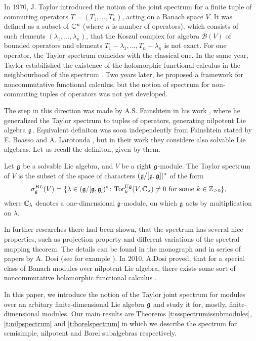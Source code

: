 In 1970, J. Taylor\cite{Taylor1970} introduced the notion of the joint spectrum for a finite tuple
of commuting operators $T = (T_1,...,T_n)$, acting on a Banach space $V$. It was defined as a
subset of $\mathbb{C}^n$ (where $n$ is number of operators), which consists of such elements
$(\lambda_1,...,\lambda_n)$, that the Koszul complex for algebra $\mathcal{B}(V)$ of bounded
operators and elements $T_1 - \lambda_1,...,T_n - \lambda_n$ is not exact. For one operator, the
Taylor spectrum coincides with the classical one. In the same year, Taylor estabilished the
existence of the holomorphic functional calculus in the neighbourhood of the spectrum
\cite{Taylor1970b}. Two years later, he proposed a framework for noncommutative functional
calculus\cite{Taylor1972}, but the notion of spectrum for non-commuting tuples of operators was not
yet developed. 

The step in this direction was made by A.S. Fainshtein in his work \cite{Fainshtein}, where he
generalized the Taylor spectrum to tuples of operators, generating nilpotent Lie algebra $\mathfrak{g}$.
Equivalent definiton was soon independently from Fainshtein stated by E. Boasso and A. Larotonda
\cite{boasso}, but in their work they considere also solvable Lie algebras. Let us recall the
definiton, given by them.
\begin{definition}
    Let $\mathfrak{g}$ be a solvable Lie algebra, and $V$ be a right $\mathfrak{g}$-module. The Taylor spectrum
    of $V$ is the subset of the space of characters $(\mathfrak{g}/[\mathfrak{g},\mathfrak{g}])^*$ of the form
    \begin{equation} \label{e:boassolarotonda}
        \sigma^{BL}_{\mathfrak{g}}(V) = \{ \lambda \in (\mathfrak{g}/[\mathfrak{g},\mathfrak{g}])^*\colon \mathrm{Tor}^{U\mathfrak{g}}_k(V,
            \mathbb{C}_\lambda)\neq 0 \text{ for some } k \in \mathbb{Z}_{\geq0}\},
    \end{equation}
    where $\mathbb{C}_\lambda$ denotes a one-dimensional $\mathfrak{g}$-module, on which $\mathfrak{g}$ acts by
    multiplication on $\lambda$.
\end{definition}
In further researches there had been shown, that the spectrum has several nice properties, such as
projection property and different variations of the spectral mapping theorem. The details can be
found in the monograph \cite{beltita} and in series of papers by A. Dosi (see for example
\cite{Dosi1}\cite{Dosi2}\cite{Dosi3}). In 2010, A.Dosi proved, that for a special class of Banach
modules over nilpotent Lie algebra, there exists some sort of noncommutative holomorphic functional
calculus \cite{Dosi4}.

In this paper, we introduce the notion of the Taylor joint spectrum for modules over an
arbitary finite-dimensional Lie algebra $\mathfrak{g}$ and study it for, mostly, finite-dimensional
modules. Our main results are Theorems \ref{t:ssspectrumissubmodules}, \ref{t:nilpspectrum} and
\ref{t:borelspectrum} in which we describe the spectrum for semisimple, nilpotent and Borel
subalgebras respectively.   
